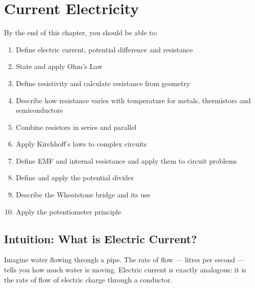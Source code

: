%

\chapter{Current Electricity}
\label{ch:current_electricity}
\minitoc
\newpage


\begin{objectivebox}
By the end of this chapter, you should be able to:
\begin{enumerate}[noitemsep]
  \item Define electric current, potential difference
  and resistance
  \item State and apply Ohm's Law
  \item Define resistivity and calculate resistance
  from geometry
  \item Describe how resistance varies with temperature
  for metals, thermistors and semiconductors
  \item Combine resistors in series and parallel
  \item Apply Kirchhoff's laws to complex circuits
  \item Define EMF and internal resistance and apply
  them to circuit problems
  \item Define and apply the potential divider
  \item Describe the Wheatstone bridge and its use
  \item Apply the potentiometer principle
\end{enumerate}
\end{objectivebox}

\section{Intuition: What is Electric Current?}

Imagine water flowing through a pipe. The rate of
flow --- litres per second --- tells you how much
water is moving. Electric current is exactly analogous:
it is the rate of flow of electric charge through a
conductor.

